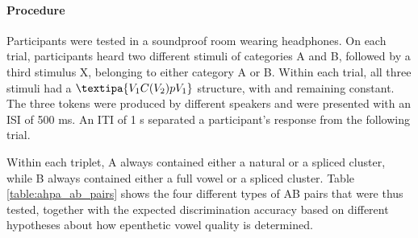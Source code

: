 \begin{table*}[h!]
\centering
\caption{Types of AB pairs for Experiment 2. The discrimination accuracy is predicted according to the following hypotheses about epenthetic vowel quality: (1) it is determined by flanking vowel quality (Flank.); (2) it is determined by coarticulation cues (Coart.); (3) participants experience default  epenthesis (Default) epenthesis; (4) participants do not experience epenthesis (No Epenth.). Cases of good discrimination are marked with plus signs.}
\label{table:ahpa_ab_pairs}
\end{table*}

\paragraph{Procedure}
Participants were tested in a soundproof room wearing headphones. On each trial, participants heard two different stimuli of categories A and B, followed by a third stimulus X, belonging to either category A or B. Within each trial, all three stimuli had a $\textipa{V_{1}C(V_{2})pV_{1}}$ structure, with  and  remaining constant. The three tokens were produced by different speakers and were presented with an ISI of 500 ms.
An ITI of 1 s separated a participant's response from the following trial.  

Within each triplet, A always contained either a natural or a spliced cluster, while B always contained either a full vowel or a spliced cluster. Table \ref{table:ahpa_ab_pairs} shows the four different types of AB pairs that were thus tested, together with the expected discrimination accuracy based on different hypotheses about how epenthetic vowel quality is determined. 

